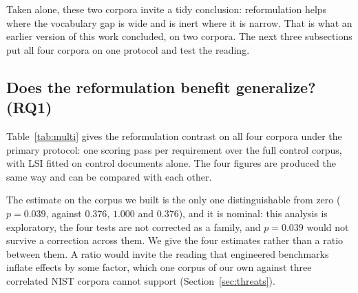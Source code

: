 \documentclass[a4paper,fleqn]{cas-sc}
\begin{document}
Taken alone, these two corpora invite a tidy conclusion: reformulation helps where the vocabulary gap is wide and is inert where it is narrow. That is what an earlier version of this work concluded, on two corpora. The next three subsections put all four corpora on one protocol and test the reading.

\subsection{Does the reformulation benefit generalize? (RQ1)}
\label{sec:results-multi}

Table~\ref{tab:multi} gives the reformulation contrast on all four corpora under the primary protocol: one scoring pass per requirement over the full control corpus, with LSI fitted on control documents alone. The four figures are produced the same way and can be compared with each other.

\begin{table}[htbp]
\caption{Effect of domain-aware reformulation on Top-1 accuracy, measured identically on all four corpora. One scoring pass per requirement over the full control corpus; LSI fitted on controls only. Intervals are requirement-level bootstrap, $p$ from paired sign-flip permutation. W/L/T counts requirements by whether reformulation turns a wrong top-1 into a right one, a right one into a wrong one, or leaves correctness unchanged. Ties include requirements whose top-ranked control changes without changing correctness.}
\label{tab:multi}
\centering
\setlength{\tabcolsep}{3pt}
\small
{}
\end{table}

The estimate on the corpus we built is the only one distinguishable from zero ($p = 0.039$, against $0.376$, $1.000$ and $0.376$), and it is nominal: this analysis is exploratory, the four tests are not corrected as a family, and $p = 0.039$ would not survive a correction across them. We give the four estimates rather than a ratio between them. A ratio would invite the reading that engineered benchmarks inflate effects by some factor, which one corpus of our own against three correlated NIST corpora cannot support (Section~\ref{sec:threats}).
\end{document}
